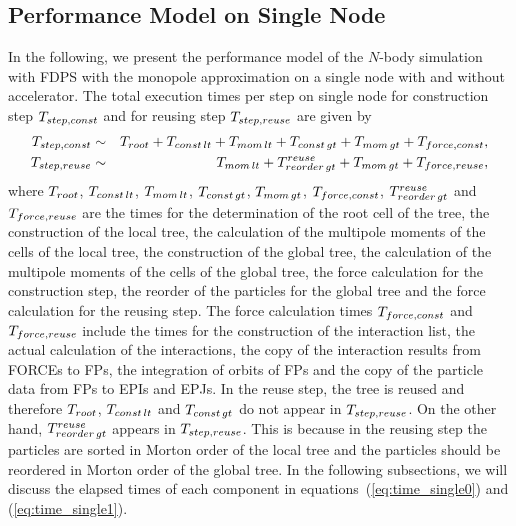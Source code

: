 \documentclass[dvipdfmx]{pasj01}
\begin{document}
\subsection{Performance Model on Single Node}
\label{sect:performancemodel}

In the following, we present the performance model of the $N$-body
simulation with FDPS with the monopole approximation on a single node
with and without accelerator. The total execution times per step on
single node for construction step $T_{\rm step, const}$ and for
reusing step $T_{\rm step, reuse}$ are given by
\begin{eqnarray}
  T_{\rm step, const} & \sim & T_{\rm root} + T_{\rm const\, lt} + T_{\rm mom\, lt} + T_{\rm const\, gt} + T_{\rm mom\, gt} + T_{\rm force, const}, \label{eq:time_single0} \\
  T_{\rm step, reuse} & \sim & T_{\rm mom\, lt} + T^{\rm reuse}_{\rm reorder\, gt} + T_{\rm mom\, gt} + T_{\rm force, reuse} \label{eq:time_single1},
\end{eqnarray}
where $T_{\rm root}$, $T_{\rm const\, lt}$, $T_{\rm mom\, lt}$,
$T_{\rm const\, gt}$, $T_{\rm mom\, gt}$, $T_{\rm force, const}$,
$T^{\rm reuse}_{\rm reorder\, gt}$ and $T_{\rm force, reuse}$ are the
times for the determination of the root cell of the tree, the
construction of the local tree, the calculation of the multipole
moments of the cells of the local tree, the construction of the global
tree, the calculation of the multipole moments of the cells of the
global tree, the force calculation for the construction step, the
reorder of the particles for the global tree and the force calculation
for the reusing step. The force calculation times $T_{\rm force,
  const}$ and $T_{\rm force, reuse}$ include the times for the
construction of the interaction list, the actual calculation of the
interactions, the copy of the interaction results from FORCEs to FPs,
the integration of orbits of FPs and the copy of the particle data
from FPs to EPIs and EPJs. In the reuse step, the tree is reused and
therefore $T_{\rm root}$, $T_{\rm const\, lt}$ and $T_{\rm const\,
  gt}$ do not appear in $T_{\rm step, reuse}$. On the other hand,
$T^{\rm reuse}_{\rm reorder\, gt}$ appears in $T_{\rm step,
  reuse}$. This is because in the reusing step the particles are
sorted in Morton order of the local tree and the particles should be
reordered in Morton order of the global tree. In the following
subsections, we will discuss the elapsed times of each component in
equations~(\ref{eq:time_single0}) and (\ref{eq:time_single1}).
\end{document}
